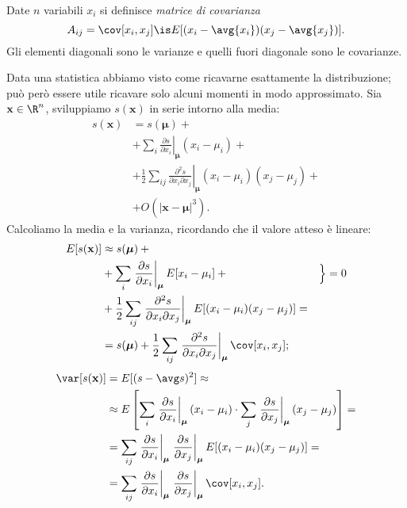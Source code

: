 
\begin{defn}
	Date $n$ variabili $x_i$ si definisce \emph{matrice di covarianza}
	\begin{equation*}
		A_{ij} = \cov[x_i,x_j] \is E[(x_i-\avg{x_i})(x_j-\avg{x_j})].
	\end{equation*}
	Gli elementi diagonali sono le varianze e quelli fuori diagonale sono le covarianze.
\end{defn}

Data una statistica abbiamo visto come ricavarne esattamente la distribuzione;
può però essere utile ricavare solo alcuni momenti in modo approssimato.
Sia $\mathbf x\in\R^n$, sviluppiamo $s(\mathbf x)$ in serie intorno alla media:
\begin{align*}
	s(\mathbf x) &= s(\boldsymbol \mu) + {}\\
	&+ \sum_i \left.\frac{\partial s}{\partial x_i}\right|_{\boldsymbol\mu} (x_i - \mu_i) + {}\\
	&+ \frac12 \sum_{ij} \left.\frac{\partial^2 s}{\partial x_i \partial x_j}\right|_{\boldsymbol\mu} (x_i-\mu_i)(x_j-\mu_j) + {}\\
	&+ O(|\mathbf x - \boldsymbol\mu|^3).
\end{align*}
Calcoliamo la media e la varianza, ricordando che il valore atteso è lineare:
\begin{align*}
	E[s(\mathbf x)] &\approx s(\boldsymbol \mu) + {}\\
	&+ \sum_i \left.\frac{\partial s}{\partial x_i}\right|_{\boldsymbol\mu} E[x_i - \mu_i] + {} & \Big\} = 0\\
	&+ \frac12 \sum_{ij} \left.\frac{\partial^2 s}{\partial x_i \partial x_j}\right|_{\boldsymbol\mu} E[(x_i-\mu_i)(x_j-\mu_j)] = \\
	&= s(\boldsymbol \mu) +
	\frac12 \sum_{ij} \left.\frac{\partial^2 s}{\partial x_i \partial x_j}\right|_{\boldsymbol\mu}
	\cov[x_i,x_j];
\end{align*}
\begin{align*}
	\var[s(\mathbf x)] &= E[(s - \avg s)^2] \approx \\
	&\approx E\left[
	\sum_i \left.\frac{\partial s}{\partial x_i}\right|_{\boldsymbol\mu} (x_i - \mu_i) \cdot
	\sum_j \left.\frac{\partial s}{\partial x_j}\right|_{\boldsymbol\mu} (x_j - \mu_j) \right] = \\
	&= \sum_{ij}
	\left.\frac{\partial s}{\partial x_i}\right|_{\boldsymbol\mu}
	\left.\frac{\partial s}{\partial x_j}\right|_{\boldsymbol\mu}
	E[ (x_i - \mu_i) (x_j - \mu_j) ] = \\
	&= \sum_{ij}
	\left.\frac{\partial s}{\partial x_i}\right|_{\boldsymbol\mu}
	\left.\frac{\partial s}{\partial x_j}\right|_{\boldsymbol\mu}
	\cov[x_i,x_j].
\end{align*}

